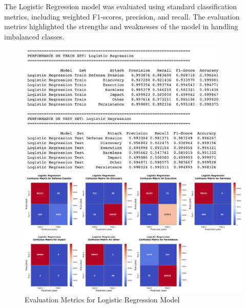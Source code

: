             The Logistic Regression model was evaluated using standard classification metrics, including weighted F1-scores, precision, and recall. The evaluation metrics highlighted the strengths and weaknesses of the model in handling imbalanced classes. 

                
            \begin{figure}[h]
                \centering
                \begin{minipage}[c]{0.47\textwidth}
                    \centering
                    \includegraphics[width=0.9\textwidth]{../figures/plots/section2/Logistic_Regression_evaluation_metrics.png}
                    \caption{Evaluation Metrics for Logistic Regression Model}
                    \label{fig:logistic_cm}
                \end{minipage}
                \hfill
                \begin{minipage}[c]{0.47\textwidth}
                    \centering
                    \vspace{0.1cm}
                    \includegraphics[width=\textwidth]{../figures/plots/section2/Logistic_Regression_normalized_confusion_matrix_test.png}

\end{minipage}
\end{figure}
